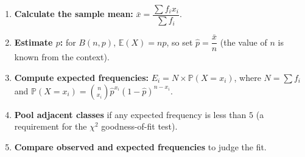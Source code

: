 \documentclass[11pt]{article}
\begin{document}
\begin{methode}
\begin{enumerate}
\item \textbf{Calculate the sample mean:} $\bar{x} = \dfrac{\sum f_i x_i}{\sum f_i}$.
\item \textbf{Estimate $p$:} for $B(n,p)$, $\mathbb{E}(X) = np$, so set $\hat{p} = \dfrac{\bar{x}}{n}$ (the value of $n$ is known from the context).
\item \textbf{Compute expected frequencies:} $E_i = N \times \mathbb{P}(X = x_i)$, where $N = \sum f_i$ and $\mathbb{P}(X = x_i) = \binom{n}{x_i} \hat{p}^{x_i} (1-\hat{p})^{n-x_i}$.
\item \textbf{Pool adjacent classes} if any expected frequency is less than $5$ (a requirement for the $\chi^2$ goodness-of-fit test).
\item \textbf{Compare observed and expected frequencies} to judge the fit.
\end{enumerate}
\end{methode}
\end{document}
